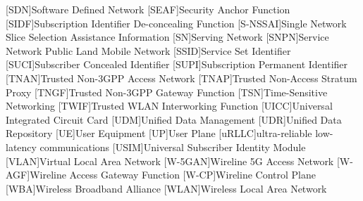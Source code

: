 \begin{multicols}{2}
\begin{acronym}[AAAAAA]
        [SDN]{Software Defined Network}
        [SEAF]{Security Anchor Function}
        [SIDF]{Subscription Identifier De-concealing Function}
        [S-NSSAI]{Single Network Slice Selection Assistance Information}
        [SN]{Serving Network}
        [SNPN]{Service Network Public Land Mobile Network}
        [SSID]{Service Set Identifier}
        [SUCI]{Subscriber Concealed Identifier}
        [SUPI]{Subscription Permanent Identifier}
        [TNAN]{Trusted Non-3GPP Access Network}
        [TNAP]{Trusted Non-Access Stratum Proxy}
        [TNGF]{Trusted Non-3GPP Gateway Function}
        [TSN]{Time-Sensitive Networking}
        [TWIF]{Trusted WLAN Interworking Function}
        [UICC]{Universal Integrated Circuit Card}
        [UDM]{Unified Data Management}
        [UDR]{Unified Data Repository}
        [UE]{User Equipment}
        [UP]{User Plane}
        [uRLLC]{ultra-reliable low-latency communications}
        [USIM]{Universal Subscriber Identity Module}
        [VLAN]{Virtual Local Area Network}
        [W-5GAN]{Wireline 5G Access Network}
        [W-AGF]{Wireline Access Gateway Function}
        [W-CP]{Wireline Control Plane}
        [WBA]{Wireless Broadband Alliance}
        [WLAN]{Wireless Local Area Network}
    \end{acronym}
\end{multicols}